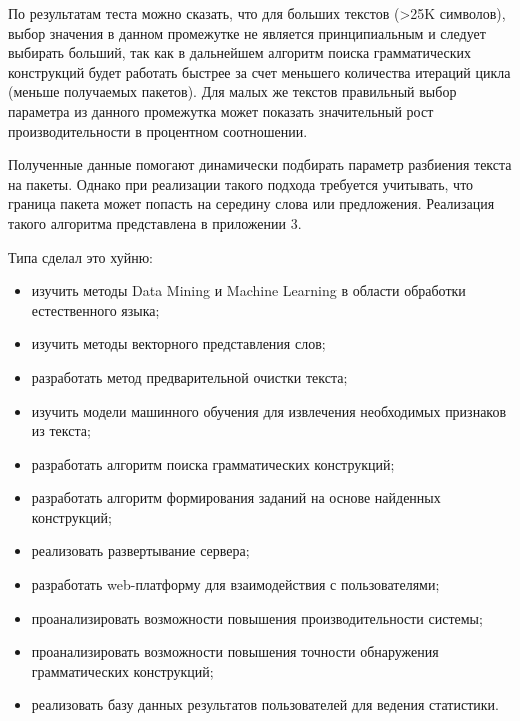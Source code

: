 По результатам теста можно сказать, что для больших текстов (>25K символов), выбор значения в данном промежутке не является принципиальным и следует выбирать больший, так как в дальнейшем алгоритм поиска грамматических конструкций будет работать быстрее за счет меньшего количества итераций цикла (меньше получаемых пакетов). Для малых же текстов правильный выбор параметра из данного промежутка может показать значительный рост производительности в процентном соотношении. 

Полученные данные помогают динамически подбирать параметр разбиения текста на пакеты. Однако при реализации такого подхода требуется учитывать, что граница пакета может попасть на середину слова или предложения. Реализация такого алгоритма представлена в приложении 3.



\newpage
\Conc

Типа сделал это хуйню:
\begin{itemize}
  \item изучить методы Data Mining и Machine Learning в области обработки естественного языка; 
  \item изучить методы векторного представления слов;
  \item разработать метод предварительной очистки текста;
  \item изучить модели машинного обучения для извлечения необходимых признаков из текста;
  \item разработать алгоритм поиска грамматических конструкций;
  \item разработать алгоритм формирования заданий на основе найденных конструкций;
  \item реализовать развертывание сервера;
  \item разработать web-платформу для взаимодействия с пользователями;
  \item проанализировать возможности повышения производительности системы;
  \item проанализировать возможности повышения точности обнаружения грамматических конструкций;
  \item реализовать базу данных результатов пользователей для ведения статистики.
\end{itemize}
\newpage

\printbibliography[%
    heading=bibintoc%
]

